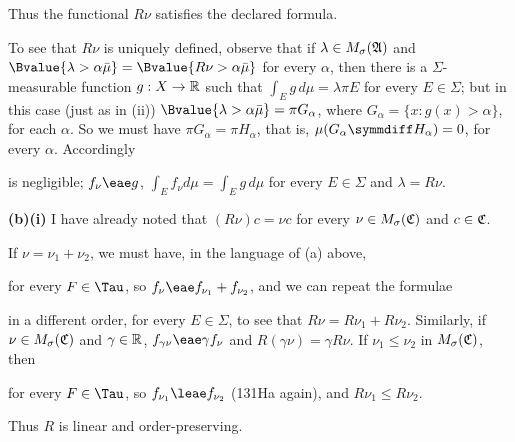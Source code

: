{Thus the functional $R\nu$ satisfies the declared formula.

\medskip

 To see that $R\nu$ is uniquely defined, observe that if
$\lambda\in M_{\sigma}(\frak A)$ and
$\Bvalue{\lambda>\alpha\bar\mu}=\Bvalue{R\nu>\alpha\bar\mu}$ for every
$\alpha$, then there is a $\Sigma$-measurable function $g:X\to\Bbb R$
such that $\int_Eg\,d\mu=\lambda\pi E$ for every $E\in\Sigma$;  but in
this case (just as in (ii)) $\Bvalue{\lambda>\alpha\bar\mu}=\pi
G_{\alpha}$, where $G_{\alpha}=\{x:g(x)>\alpha\}$, for each $\alpha$.
So we must have $\pi G_{\alpha}=\pi H_{\alpha}$, that is,
$\mu(G_{\alpha}\symmdiff H_{\alpha})=0$, for every $\alpha$.
Accordingly


\noindent is negligible;  $f_{\nu}\eae g$,
$\int_Ef_{\nu}d\mu=\int_Eg\,d\mu$ for every $E\in\Sigma$ and
$\lambda=R\nu$.

\medskip

{\bf (b)(i)} I have already noted that $(R\nu)c=\nu c$ for every
$\nu\in M_{\sigma}(\frak C)$ and $c\in\frak C$.

\medskip

 If $\nu=\nu_1+\nu_2$, we must have, in the language of (a)
above,


\noindent for every $F\in\Tau$, so $f_{\nu}\eae f_{\nu_1}+f_{\nu_2}$,
and we can repeat the formulae


\noindent in a different order, for every $E\in\Sigma$, to see that
$R\nu=R\nu_1+R\nu_2$.   Similarly, if $\nu\in M_{\sigma}(\frak C)$ and
$\gamma\in\Bbb R$, $f_{\gamma\nu}\eae\gamma f_{\nu}$ and
$R(\gamma\nu)=\gamma R\nu$.   If $\nu_1\le\nu_2$ in
$M_{\sigma}(\frak C)$, then


\noindent for every $F\in\Tau$, so $f_{\nu_1}\leae f_{\nu_2}$
(131Ha again), and $R\nu_1\le R\nu_2$.

Thus $R$ is linear and order-preserving.

\medskip

}
